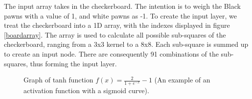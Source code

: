 \documentclass[12pt,a4paper]{article}
\begin{document}
        The input array takes in the checkerboard. The intention is to weigh the Black pawns with a value of 1, and white pawns as -1. To create the input layer, we treat the checkerboard into a 1D array, with the indexes displayed in figure \ref{boardarray}. The array is used to calculate all possible sub-squares of the checkerboard, ranging from a 3x3 kernel to a 8x8. Each sub-square is summed up to create an input node. There are consequently 91 combinations of the sub-squares, thus forming the input layer. 


        \begin{figure}
            \centering
            \vspace{-10pt}
            \caption{Graph of tanh function $f(x)={\frac{2}{1+e^{-x}}- 1}$ (An example of an activation function with a sigmoid curve). \label{sigmoid}}
            \vspace{-20pt}
        \end{figure}
        
\end{document}
